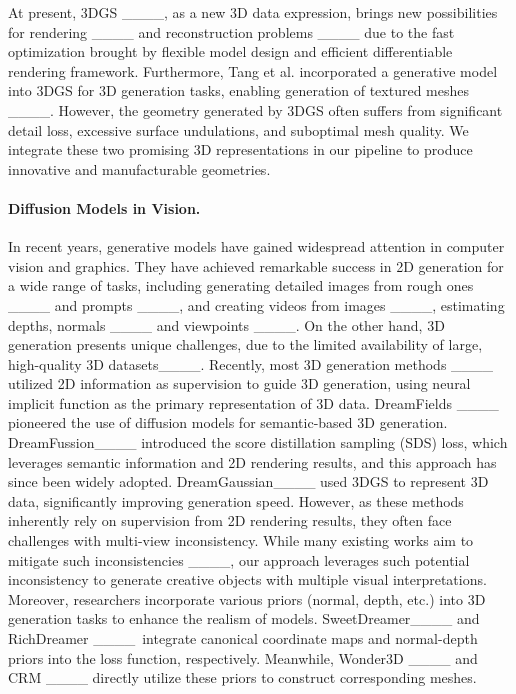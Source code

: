 At present, 3DGS ____, as a new 3D data expression, brings new possibilities for rendering ____ and reconstruction problems ____ due to the fast optimization brought by flexible model design and efficient differentiable rendering framework. Furthermore, Tang et al. incorporated a generative model into 3DGS for 3D generation tasks, enabling generation of textured meshes ____. However, the geometry generated by 3DGS often suffers from significant detail loss, excessive surface undulations, and suboptimal mesh quality. We integrate these two promising 3D representations in our pipeline to produce innovative and manufacturable geometries.


\paragraph{Diffusion Models in Vision.} In recent years, generative models have gained widespread attention in computer vision and graphics. They have achieved remarkable success in 2D generation for a wide range of tasks, including generating detailed images from rough ones ____ and prompts ____, and creating videos from images ____, estimating depths, normals ____ and viewpoints ____.
On the other hand, 3D generation presents unique challenges, due to the limited availability of large, high-quality 3D datasets____. Recently, most 3D generation methods ____ utilized 2D information as supervision to guide 3D generation, using neural implicit function as the primary representation of 3D data. DreamFields ____ pioneered the use of diffusion models for semantic-based 3D generation. DreamFussion____ introduced the score distillation sampling (SDS) loss, which leverages semantic information and 2D rendering results, and this approach has since been widely adopted. DreamGaussian____ used 3DGS to represent 3D data, significantly improving generation speed. However, as these methods inherently rely on supervision from 2D rendering results, they often face challenges with multi-view inconsistency. While many existing works aim to mitigate such inconsistencies ____, our approach leverages such potential inconsistency to generate creative objects with multiple visual interpretations. Moreover, researchers incorporate various priors (normal, depth, etc.) into 3D generation tasks to enhance the realism of models. SweetDreamer____ and RichDreamer ____~integrate canonical coordinate maps and normal-depth priors into the loss function, respectively. Meanwhile, Wonder3D ____ and CRM ____ directly utilize these priors to construct corresponding meshes.
